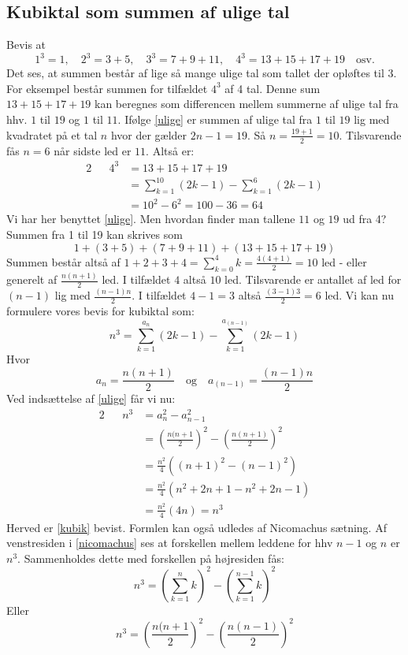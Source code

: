 \subsection{Kubiktal som summen af ulige tal}
Bevis at \[1^3=1,\quad 2^3=3+5,\quad 3^3=7+9+11,\quad 4^3=13+15+17+19 \quad \text{osv.}\]
Det ses, at summen består af lige så mange ulige tal som tallet der opløftes til \(3\). For eksempel består summen for tilfældet \(4^3\) af 4 tal. Denne sum \(13+15+17+19\) kan beregnes som differencen mellem summerne af ulige tal fra hhv. \(1\) til \(19\) og \(1\) til \(11\). Ifølge \ref{ulige} er summen af ulige tal fra \(1\) til \(19\) lig med kvadratet på et tal \(n\) hvor der gælder \(2n-1=19\). Så \(n=\frac{19+1}{2}=10\). Tilsvarende fås \(n=6\) når sidste led er \(11\). Altså er:
\begin{alignat*}{2}
&&4^3&=13+15+17+19\\
&&&=\sum_{k=1}^{10}(2k-1)-\sum_{k=1}^{6}(2k-1)\\
&&&=10^2-6^2=100-36=64
\end{alignat*}
Vi har her benyttet \ref{ulige}. Men hvordan finder man tallene \(11\) og \(19\) ud fra 4? Summen fra 1 til 19 kan skrives som 
\[1+(3+5)+(7+9+11)+(13+15+17+19)\]
Summen består altså af \(1+2+3+4=\sum_{k=0}^{4}k=\frac{4(4+1)}{2}=10\) led - eller generelt af \(\frac{n(n+1)}{2}\) led. I tilfældet \(4\) altså \(10\) led. Tilsvarende er antallet af led for \((n-1)\) lig med \(\frac{(n-1)n}{2}\). I tilfældet \(4-1=3\) altså \(\frac{(3-1)3}{2}=6\) led. Vi kan nu formulere vores bevis for kubiktal som:
\begin{equation}
n^3=\sum_{k=1}^{a_n}(2k-1)-\sum_{k=1}^{a_{(n-1)}}(2k-1)\label{kubik}
\end{equation}
Hvor 
\[a_n=\frac{n(n+1)}{2} \quad \text{og} \quad a_{(n-1)}=\frac{(n-1)n}{2}\]
Ved indsættelse af \ref{ulige} får vi nu:
\begin{alignat*}{2}
&&n^3&=a_n^2-a_{n-1}^2\\
&&&=\left(\frac{n(n+1}{2}\right)^2-\left(\frac{n(n+1)}{2}\right)^2\\
&&&=\frac{n^2}{4}\left((n+1)^2-(n-1)^2\right)\\
&&&=\frac{n^2}{4}(n^2+2n+1-n^2+2n-1)\\
&&&=\frac{n^2}{4}(4n)=n^3
\end{alignat*}
Herved er \ref{kubik} bevist. Formlen kan også udledes af Nicomachus sætning. Af  venstresiden i \ref{nicomachus} ses at forskellen mellem leddene for hhv \(n-1\) og \(n\) er \(n^3\). Sammenholdes dette med forskellen på højresiden fås:
\[n^3=\left(\sum_{k=1}^{n}k\right)^{2}-\left(\sum_{k=1}^{n-1}k\right)^{2}\]
Eller
\begin{equation}
n^3=\left(\frac{n(n+1}{2}\right)^2-\left(\frac{n(n-1)}{2}\right)^2 \label{kubika}
\end{equation}


